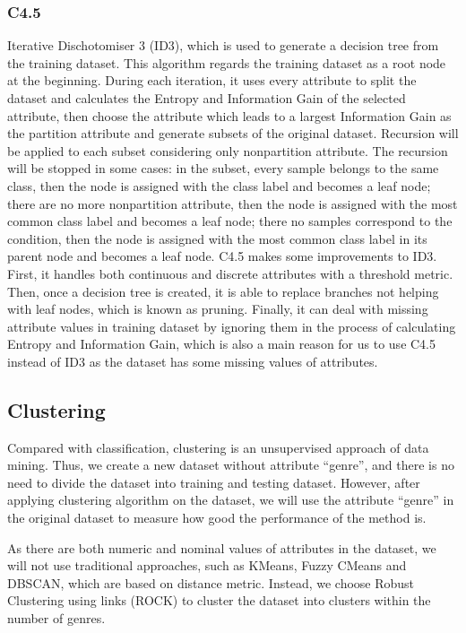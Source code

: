 \documentclass[conference]{IEEEtran}
\begin{document}
\subsubsection{C4.5}
Iterative Dischotomiser 3 (ID3), which is used to generate a decision tree from the training dataset. This algorithm regards the training dataset as a root node at the beginning. During each iteration, it uses every attribute to split the dataset and calculates the Entropy and Information Gain of the selected attribute, then choose the attribute which leads to a largest Information Gain as the partition attribute and generate subsets of the original dataset. Recursion will be applied to each subset considering only non­partition attribute. The recursion will be stopped in some cases: in the subset, every sample belongs to the same class, then the node is assigned with the class label and becomes a leaf node; there are no more non­partition attribute, then the node is assigned with the most common class label and becomes a leaf node; there no samples correspond to the condition, then the node is assigned with the most common class label in its parent node and becomes a leaf node. C4.5 makes some improvements to ID3. First, it handles both continuous and discrete attributes with a threshold metric. Then, once a decision tree is created, it is able to replace branches not helping with leaf nodes, which is known as pruning. Finally, it can deal with missing attribute values in training dataset by ignoring them in the process of calculating Entropy and Information Gain, which is also a main reason for us to use C4.5 instead of ID3 as the dataset has some missing values of attributes.

\subsection{Clustering}
Compared with classification, clustering is an unsupervised approach of data mining. Thus, we create a new dataset without attribute “genre”, and there is no need to divide the dataset into training and testing dataset. However, after applying clustering algorithm on the dataset, we will use the attribute “genre” in the original dataset to measure how good the performance of the method is.

As there are both numeric and nominal values of attributes in the dataset, we will not use traditional approaches, such as K­Means, Fuzzy C­Means and DBSCAN, which are based on distance metric. Instead, we choose Robust Clustering using links (ROCK) to cluster the dataset into clusters within the number of genres.
\end{document}
